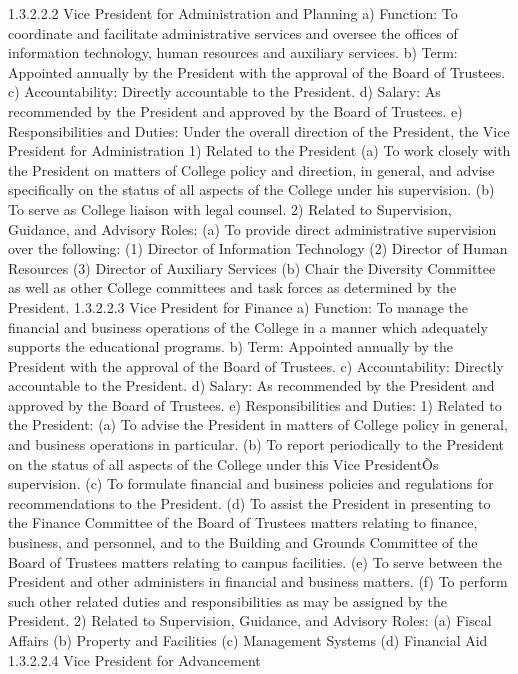 \documentclass[letterpaper, 11pt]{article}
\begin{document}
1.3.2.2.2 	Vice President for Administration and Planning
a) Function:  To coordinate and facilitate administrative services and oversee the offices of information technology, human resources and auxiliary services.
b) Term:  Appointed annually by the President with the approval of the Board of Trustees.
c) Accountability:  Directly accountable to the President.
d) Salary:  As recommended by the President and approved by the Board of Trustees.
e) Responsibilities and Duties:  Under the overall direction of the President, the Vice President for Administration  
1) Related to the President
(a) To work closely with the President on matters of College policy and direction, in general, and advise specifically on the status of all aspects of the College under his supervision.
(b) To serve as College liaison with legal counsel.
2) Related to Supervision, Guidance, and Advisory Roles:
(a) To provide direct administrative supervision over the following:
(1) Director of Information Technology
(2) Director of Human Resources
(3) Director of Auxiliary Services
(b) Chair the Diversity Committee as well as other College committees and task forces as determined by the President.
1.3.2.2.3 Vice President for Finance
a) Function: To manage the financial and business operations of the College in a manner which adequately supports the educational programs.
b) Term: Appointed annually by the President with the approval of the Board of Trustees.
c) Accountability: Directly accountable to the President.
d) Salary: As recommended by the President and approved by the Board of Trustees.
e) Responsibilities and Duties:
1) Related to the President:
(a) To advise the President in matters of College policy in general, and business operations in particular.
(b) To report periodically to the President on the status of all aspects of the College under this Vice PresidentÕs supervision.
(c) To formulate financial and business policies and regulations for recommendations to the President.
(d) To assist the President in presenting to the Finance Committee of the Board of Trustees matters relating to finance, business, and personnel, and to the Building and Grounds Committee of the Board of Trustees matters relating to campus facilities.
(e) To serve between the President and other administers in financial and business matters.
(f) To perform such other related duties and responsibilities as may be assigned by the President.
2) Related to Supervision, Guidance, and Advisory Roles:
(a) Fiscal Affairs
(b) Property and Facilities
(c) Management Systems
(d) Financial Aid
1.3.2.2.4 	Vice President for Advancement
\end{document}
